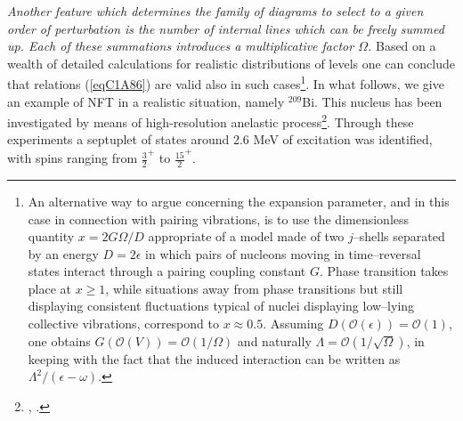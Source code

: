 \textit{Another feature which determines the family of diagrams to select to a given order of perturbation is the number of internal lines which can be freely summed up. Each of these summations introduces a multiplicative factor $\Omega$.} Based on a wealth of detailed calculations for realistic distributions of levels one can conclude that  relations (\ref{eqC1A86}) are valid also in such cases\footnote{\label{fn107}An alternative way to argue concerning the expansion parameter, and in this case in connection with pairing vibrations, is to use the dimensionless quantity $x=2G\Omega/D$ appropriate of a model made of two $j$--shells separated by an energy $D=2\epsilon$ in which pairs of nucleons moving in time--reversal states interact through a pairing coupling constant $G$. Phase transition takes place at $x\geq1$, while situations away from phase transitions but still displaying consistent fluctuations typical of nuclei displaying low--lying collective vibrations, correspond to $x\approx0.5$. Assuming $D(\mathcal O(\epsilon))=\mathcal O(1)$, one obtains $G(\mathcal O(V))=\mathcal O(1/\Omega)$ and naturally $\Lambda=\mathcal O(1/\sqrt{\Omega})$, in keeping with the fact that the induced interaction can be written as $\Lambda^2/(\epsilon-\omega)$.}.  In what follows, we give an example of NFT in a realistic situation, namely $^{209}$Bi. 
This nucleus has been investigated by means of high-resolution anelastic process\footnote{\cite{Ungrin:71}, \cite{Broglia:70}.}. Through these experiments a septuplet of states around 2.6 MeV of excitation was identified, with spins 
ranging from $\frac{3}{2}^+$ to $\frac{15}{2}^+$. 


